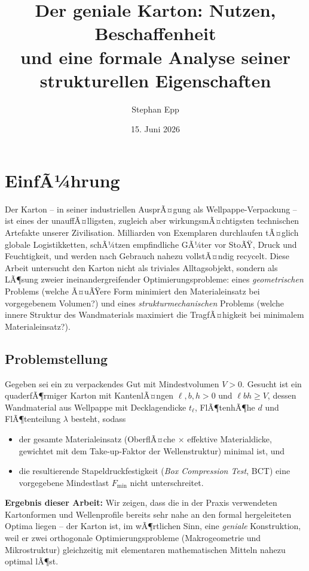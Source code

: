 ﻿\documentclass[a4paper,12pt]{article}
\title{Der geniale Karton: Nutzen, Beschaffenheit\\ und eine formale Analyse seiner strukturellen Eigenschaften}
\author{Stephan Epp}
\date{15. Juni 2026}
\theoremstyle{definition}
\begin{document}
\maketitle

\tableofcontents
\newpage

\section{EinfÃ¼hrung}

Der Karton -- in seiner industriellen AusprÃ¤gung als Wellpappe-Verpackung -- ist eines der
unauffÃ¤lligsten, zugleich aber wirkungsmÃ¤chtigsten technischen Artefakte unserer
Zivilisation. Milliarden von Exemplaren durchlaufen tÃ¤glich globale Logistikketten,
schÃ¼tzen empfindliche GÃ¼ter vor StoÃŸ, Druck und Feuchtigkeit, und werden nach Gebrauch
nahezu vollstÃ¤ndig recycelt. Diese Arbeit untersucht den Karton nicht als triviales
Alltagsobjekt, sondern als LÃ¶sung zweier ineinandergreifender Optimierungsprobleme:
eines \emph{geometrischen} Problems (welche Ã¤uÃŸere Form minimiert den Materialeinsatz
bei vorgegebenem Volumen?) und eines \emph{strukturmechanischen} Problems (welche
innere Struktur des Wandmaterials maximiert die TragfÃ¤higkeit bei minimalem
Materialeinsatz?).

\subsection{Problemstellung}

Gegeben sei ein zu verpackendes Gut mit Mindestvolumen $V > 0$. Gesucht ist ein
quaderfÃ¶rmiger Karton mit KantenlÃ¤ngen $\ell, b, h > 0$ und $\ell b h \geq V$, dessen
Wandmaterial aus Wellpappe mit Decklagendicke $t_\ell$, FlÃ¶tenhÃ¶he $d$ und FlÃ¶tenteilung
$\lambda$ besteht, sodass

\begin{itemize}
	\item der gesamte Materialeinsatz (OberflÃ¤che $\times$ effektive Materialdicke,
	      gewichtet mit dem Take-up-Faktor der Wellenstruktur) minimal ist, und
	\item die resultierende Stapeldruckfestigkeit (\emph{Box Compression Test},
	      BCT) eine vorgegebene Mindestlast $F_{\min}$ nicht unterschreitet.
\end{itemize}

\textbf{Ergebnis dieser Arbeit:} Wir zeigen, dass die in der Praxis verwendeten
Kartonformen und Wellenprofile bereits sehr nahe an den formal hergeleiteten Optima
liegen -- der Karton ist, im wÃ¶rtlichen Sinn, eine \emph{geniale} Konstruktion, weil er
zwei orthogonale Optimierungsprobleme (Makrogeometrie und Mikrostruktur) gleichzeitig
mit elementaren mathematischen Mitteln nahezu optimal lÃ¶st.
\end{document}
